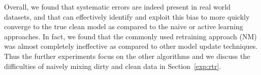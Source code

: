 Overall, we found that systematic errors are indeed present in real world datasets, and that \sys can effectively identify and exploit this bias
to more quickly converge to the true clean model as compared to the naive or active learning approaches.  
In fact, we found that the commonly used retraining approach (NM) was almost completely ineffective as compared to other model update techniques.
Thus the further experiments focus on the other algorithms and we discuss the difficulties of naively mixing dirty and clean data in Section~\ref{exp:rtr}.




